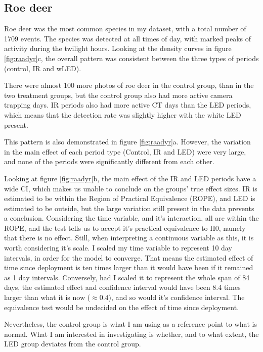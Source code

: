 \subsection{Roe deer}

Roe deer was the most common species in my dataset, with a total number of 1709 events.
The species was detected at all times of day, with marked peaks of activity during the twilight hours.
Looking at the density curves in figure \ref{fig:raadyr}c, the overall pattern was consistent between the three types of periods (control, IR and wLED). 


There were almost 100 more photos of roe deer in the control group, than in the two treatment groups, but the control group also had more active camera trapping days.
IR periods also had more active CT days than the LED periods, which means that the detection rate was slightly higher with the white LED present.


This pattern is also demonstrated in figure \ref{fig:raadyr}a. 
However, the variation in the main effect of each period type (Control, IR and LED) were very large, and none of the periods were significantly different from each other.

Looking at figure \ref{fig:raadyr}b, the main effect of the IR and LED periods have a wide CI, which makes us unable to conclude on the groups' true effect sizes. IR is estimated to be within the Region of Practical Equivalence (ROPE), and LED is estimated to be outside, but the large variation still present in the data prevents a conclusion.
Considering the time variable, and it's interaction, all are within the ROPE, and the test tells us to accept it's practical equivalence to H0, namely that there is no effect.
Still, when interpreting a continuous variable as this, it is worth considering it's scale. I scaled my time variable to represent 10 day intervals, in order for the model to converge. That means the estimated effect of time since deployment is ten times larger than it would have been if it remained as 1 day intervals. Conversely, had I scaled it to represent the whole span of 84 days, the estimated effect and confidence interval would have been 8.4 times larger than what it is now ($\approx 0.4 $), and so would it's confidence interval. The equivalence test would be undecided on the effect of time since deployment.

Nevertheless, the control-group is what I am using as a reference point to what is normal. What I am interested in investigating is whether, and to what extent, the LED group deviates from the control group.

